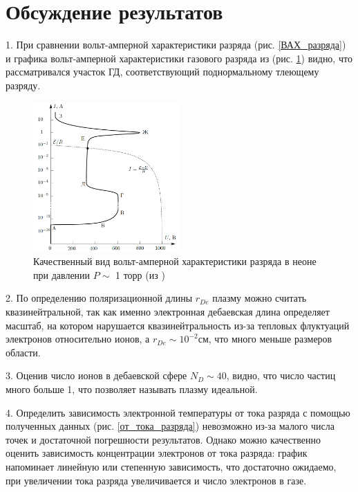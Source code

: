 \documentclass[a4paper,12pt]{article} %
\begin{document}
\section{Обсуждение результатов}


1.  При сравнении вольт-амперной характеристики разряда (рис. \ref{ВАХ_разряда}) и графика вольт-амперной характеристики газового разряда из \cite{labnik} (рис. \ref{приложение}) видно, что рассматривался участок ГД, соответствующий поднормальному тлеющему разряду.

\begin{figure}[h!]
\begin{center}
\includegraphics[width=0.5\textwidth]{Приложение}
\caption{Качественный вид вольт-амперной характеристики разряда в неоне при давлении $P \sim$ 1 торр (из \cite{labnik})} \label{приложение}
\end{center}
\end{figure}

2. По определению поляризационной длины $r_{De}$ плазму можно считать квазинейтральной, так как именно электронная дебаевская длина определяет масштаб, на котором нарушается квазинейтральность из-за тепловых флуктуаций электронов относительно ионов, а $r_{De} \sim 10^{-2} см$, что много меньше размеров области.

3. Оценив число ионов в дебаевской сфере $N_D \sim 40$, видно, что число частиц много больше 1, что позволяет называть плазму идеальной.

4. Определить зависимость электронной температуры от тока разряда с помощью полученных данных (рис. \ref{от_тока_разряда}) невозможно из-за малого числа точек и достаточной погрешности результатов. Однако можно качественно оценить зависимость концентрации электронов от тока разряда: график напоминает линейную или степенную зависимость, что достаточно ожидаемо, при увеличении тока разряда увеличивается и число электронов в газе.
\end{document}
